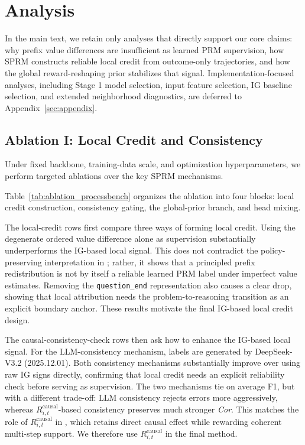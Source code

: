 \section{Analysis}
\label{sec:analysis}
In the main text, we retain only analyses that directly support our core
claims: why prefix value differences are insufficient as learned PRM
supervision, how SPRM constructs reliable local credit from outcome-only
trajectories, and how the global reward-reshaping prior stabilizes that signal.
Implementation-focused analyses, including Stage 1 model selection, input
feature selection, IG baseline selection, and extended neighborhood
diagnostics, are deferred to Appendix~\ref{sec:appendix}.

\subsection{Ablation I: Local Credit and Consistency}
\label{ablation_study}
Under fixed backbone, training-data scale, and optimization hyperparameters, we
perform targeted ablations over the key SPRM mechanisms.

Table~\ref{tab:ablation_processbench} organizes the ablation into four
blocks: local credit construction, consistency gating, the global-prior
branch, and head mixing.

The local-credit rows first compare three ways of forming local credit.
Using the degenerate ordered value difference alone as supervision substantially
underperforms the IG-based local signal.
This does not contradict the policy-preserving interpretation in
; rather, it shows that a principled prefix
redistribution is not by itself a reliable learned PRM label under imperfect
value estimates.
Removing the \texttt{question\_end} representation also causes a clear drop,
showing that local attribution needs the problem-to-reasoning transition as an
explicit boundary anchor.
These results motivate the final IG-based local credit design.

The causal-consistency-check rows then ask how to enhance the IG-based local signal.
For the LLM-consistency mechanism, labels are generated by DeepSeek-V3.2 (2025.12.01).
Both consistency mechanisms substantially improve over using raw IG signs
directly, confirming that local credit needs an explicit reliability check
before serving as supervision.
The two mechanisms tie on average F1, but with a different trade-off: LLM
consistency rejects errors more aggressively, whereas
\(R_{i,t}^{\mathrm{causal}}\)-based consistency preserves much stronger
\textit{Cor}.
This matches the role of \(R_{i,t}^{\mathrm{causal}}\) in
, which retains direct causal effect while
rewarding coherent multi-step support.
We therefore use \(R_{i,t}^{\mathrm{causal}}\) in the final method.

